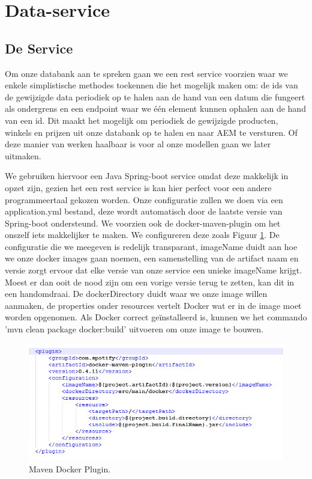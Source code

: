 \documentclass{article}
\begin{document}
	\section{Data-service}
	
	\subsection{De Service}
	Om onze databank aan te spreken gaan we een rest service voorzien waar we enkele simplistische methodes toekennen die het mogelijk maken om: de ids van de gewijzigde data periodiek op te halen aan de hand van een datum die fungeert als ondergrens en een endpoint waar we één element kunnen ophalen aan de hand van een id. Dit maakt het mogelijk om periodiek de gewijzigde producten, winkels en prijzen uit onze databank op te halen en naar AEM te versturen. Of deze manier van werken haalbaar is voor al onze modellen gaan we later uitmaken.
	\par
	We gebruiken hiervoor een Java Spring-boot service omdat deze makkelijk in opzet zijn, gezien het een rest service is kan hier perfect voor een andere programmeertaal gekozen worden. Onze configuratie zullen we doen via een application.yml bestand, deze wordt automatisch door de laatste versie van Spring-boot ondersteund. We voorzien ook de docker-maven-plugin om het onszelf iets makkelijker te maken. We configureren deze zoals Figuur \ref{fig:docker-plugin}. De configuratie die we meegeven is redelijk transparant, imageName duidt aan hoe we onze docker images gaan noemen, een samenstelling van de artifact naam en versie zorgt ervoor dat elke versie van onze service een unieke imageName krijgt. Moest er dan ooit de nood zijn om een vorige versie terug te zetten, kan dit in een handomdraai. De dockerDirectory duidt waar we onze image willen aanmaken, de properties onder resources vertelt Docker wat er in de image moet worden opgenomen. Als Docker correct geïnstalleerd is, kunnen we het commando 'mvn clean package docker:build' uitvoeren om onze image te bouwen.
	
	\begin{figure}[h!]
		\centering
  		\includegraphics[width=\linewidth]{images/maven-plugin.PNG}
  		\caption{Maven Docker Plugin.}
  		\label{fig:docker-plugin}
	\end{figure}
\end{document}
